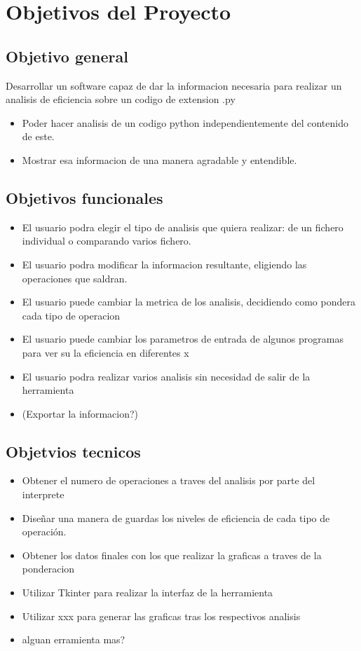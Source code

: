 
\section{Objetivos del Proyecto}

\subsection{Objetivo general}


Desarrollar un software capaz de dar la informacion necesaria para realizar un analisis de eficiencia sobre un codigo de extension .py
\begin{itemize}
	\item Poder hacer analisis de un codigo python independientemente del contenido de este.
	\item Mostrar esa informacion de una manera agradable y entendible.
\end{itemize}


\subsection{Objetivos funcionales}
	\begin{itemize}
	\item El usuario podra elegir el tipo de analisis que quiera realizar: de un fichero individual o comparando varios fichero.
	\item El usuario podra modificar la informacion resultante, eligiendo las operaciones que saldran.
	\item El usuario puede cambiar la metrica de los analisis, decidiendo como pondera cada tipo de operacion
	\item El usuario puede cambiar los parametros de entrada de algunos programas para ver su la eficiencia en diferentes x
	\item El usuario podra realizar varios analisis sin necesidad de salir de la herramienta
	\item(Exportar la informacion?)
\end{itemize}


\subsection{Objetvios tecnicos}
	\begin{itemize}
	\item Obtener el numero de operaciones a traves del analisis por parte del interprete
	\item Diseñar una manera de guardas los niveles de eficiencia de cada tipo de operación.
	\item Obtener los datos finales con los que realizar la  graficas a traves de la ponderacion
	\item Utilizar Tkinter para realizar la interfaz de la herramienta
	\item Utilizar xxx  para generar las graficas tras los respectivos analisis
	\item alguan erramienta mas?
\end{itemize}
